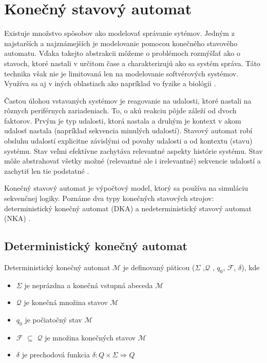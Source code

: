 \section{Konečný stavový automat} \label{state-machine-theory}
\noindent Existuje množstvo spôsobov ako modelovať správanie sytémov. Jedným z
najstarších a najznámejších je modelovanie pomocou konečného stavového automatu.
Vďaka takejto abstrakcii môžeme o problémoch rozmýšľať ako o stavoch, ktoré nastali v určitom čase a charakterizujú ako sa systém správa.
Táto technika však nie je limitovaná len na modelovanie softvérových systémov. Využíva sa aj v iných oblastiach ako napríklad vo fyzike a biológii \cite{WaybackMachine2014}.
\par Častou úlohou vstavaných systémov je reagovanie na udalosti, ktoré nastali  na rôznych
periférnych zariadeniach. To, o akú reakciu pôjde záleží od dvoch faktorov. Prvým je typ
udalosti, ktorá nastala a druhým je kontext v akom udalosť nastala
(napríklad sekvencia minulých udalostí). Stavový automat robí obsluhu udalostí explicitne závislými od povahy udalosti a od kontextu (stavu) systému.
Stav veľmi efektívne zachytáva relevantné aspekty histórie systému.
Stav môže abstrahovať všetky možné (relevantné ale i irelevantné) sekvencie udalostí a zachytiť len tie podstatné \cite{samekStateMachinesEventDriven2016}.
\par Konečný stavový automat je výpočtový model, ktorý sa používa na simuláciu sekvenčnej logiky.
Poznáme dva typy konečných stavových strojov: deterministický konečný automat (DKA)  a nedeterministický stavový automat (NKA) \cite{FiniteStateMachines}.

\subsection{Deterministický konečný automat}
\noindent Deterministický konečný automat $\mathcal{M}$ je definovaný päticou ($\Sigma$ ,$\mathcal{Q}$ , $q_0$, $\mathcal{F}$, $\delta$), kde
\begin{itemize}
    \item $\Sigma$ je neprázdna a konečná vstupná abeceda $\mathcal{M}$
    \item $\mathcal{Q}$ je konečná množina stavov $\mathcal{M}$
    \item $q_0$ je počiatočný stav $\mathcal{M}$
    \item $\mathcal{F}$ $\subseteq$ $\mathcal{Q}$ je množina konečných stavov $\mathcal{M}$
    \item $\delta$ je prechodová funkcia  \begin{math}\delta : Q \times \Sigma \Rightarrow Q\end{math}
\end{itemize}

